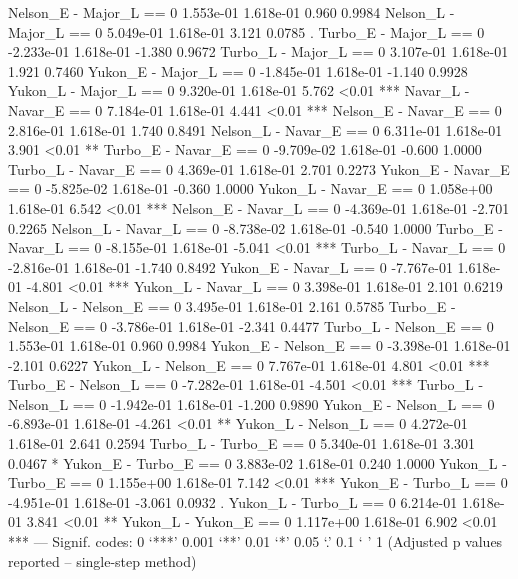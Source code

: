 Nelson_E - Major_L == 0   1.553e-01  1.618e-01     0.960   0.9984    
Nelson_L - Major_L == 0   5.049e-01  1.618e-01     3.121   0.0785 .  
Turbo_E - Major_L == 0   -2.233e-01  1.618e-01    -1.380   0.9672    
Turbo_L - Major_L == 0    3.107e-01  1.618e-01     1.921   0.7460    
Yukon_E - Major_L == 0   -1.845e-01  1.618e-01    -1.140   0.9928    
Yukon_L - Major_L == 0    9.320e-01  1.618e-01     5.762    <0.01 ***
Navar_L - Navar_E == 0    7.184e-01  1.618e-01     4.441    <0.01 ***
Nelson_E - Navar_E == 0   2.816e-01  1.618e-01     1.740   0.8491    
Nelson_L - Navar_E == 0   6.311e-01  1.618e-01     3.901    <0.01 ** 
Turbo_E - Navar_E == 0   -9.709e-02  1.618e-01    -0.600   1.0000    
Turbo_L - Navar_E == 0    4.369e-01  1.618e-01     2.701   0.2273    
Yukon_E - Navar_E == 0   -5.825e-02  1.618e-01    -0.360   1.0000    
Yukon_L - Navar_E == 0    1.058e+00  1.618e-01     6.542    <0.01 ***
Nelson_E - Navar_L == 0  -4.369e-01  1.618e-01    -2.701   0.2265    
Nelson_L - Navar_L == 0  -8.738e-02  1.618e-01    -0.540   1.0000    
Turbo_E - Navar_L == 0   -8.155e-01  1.618e-01    -5.041    <0.01 ***
Turbo_L - Navar_L == 0   -2.816e-01  1.618e-01    -1.740   0.8492    
Yukon_E - Navar_L == 0   -7.767e-01  1.618e-01    -4.801    <0.01 ***
Yukon_L - Navar_L == 0    3.398e-01  1.618e-01     2.101   0.6219    
Nelson_L - Nelson_E == 0  3.495e-01  1.618e-01     2.161   0.5785    
Turbo_E - Nelson_E == 0  -3.786e-01  1.618e-01    -2.341   0.4477    
Turbo_L - Nelson_E == 0   1.553e-01  1.618e-01     0.960   0.9984    
Yukon_E - Nelson_E == 0  -3.398e-01  1.618e-01    -2.101   0.6227    
Yukon_L - Nelson_E == 0   7.767e-01  1.618e-01     4.801    <0.01 ***
Turbo_E - Nelson_L == 0  -7.282e-01  1.618e-01    -4.501    <0.01 ***
Turbo_L - Nelson_L == 0  -1.942e-01  1.618e-01    -1.200   0.9890    
Yukon_E - Nelson_L == 0  -6.893e-01  1.618e-01    -4.261    <0.01 ** 
Yukon_L - Nelson_L == 0   4.272e-01  1.618e-01     2.641   0.2594    
Turbo_L - Turbo_E == 0    5.340e-01  1.618e-01     3.301   0.0467 *  
Yukon_E - Turbo_E == 0    3.883e-02  1.618e-01     0.240   1.0000    
Yukon_L - Turbo_E == 0    1.155e+00  1.618e-01     7.142    <0.01 ***
Yukon_E - Turbo_L == 0   -4.951e-01  1.618e-01    -3.061   0.0932 .  
Yukon_L - Turbo_L == 0    6.214e-01  1.618e-01     3.841    <0.01 ** 
Yukon_L - Yukon_E == 0    1.117e+00  1.618e-01     6.902    <0.01 ***
---
Signif. codes:  0 ‘***’ 0.001 ‘**’ 0.01 ‘*’ 0.05 ‘.’ 0.1 ‘ ’ 1 
(Adjusted p values reported -- single-step method)

